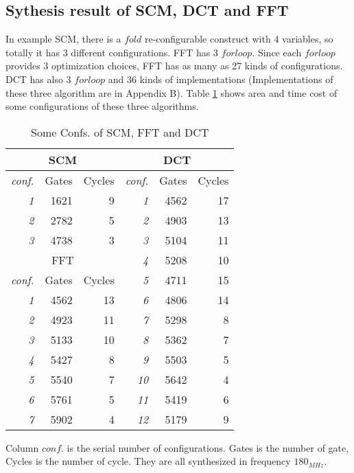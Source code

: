 \subsection{Sythesis result of SCM, DCT and FFT}
In example SCM, there is a $fold$ re-configurable construct with 4 variables, so totally it has 3 different configurations. FFT has 3 $forloop$. Since each $forloop$ provides 3 optimization choices, FFT has as many as 27 kinds of configurations. DCT has also 3 $forloop$ and 36 kinds of implementations (Implementations of these three algorithm are in Appendix B).
Table \ref{table:confs} shows area and time cost of some configurations of these three algorithms.
\begin{table}[hb]
\centering
\caption{Some Confs. of SCM, FFT and DCT}
\begin{tabular}{|r|rr|r|rr|} \hline
\multicolumn{3}{|c|}{SCM} & \multicolumn{3}{c|}{DCT} \\ \hline
\textit{conf.} & Gates & Cycles & \textit{conf.} & Gates & Cycles \\ \hline
\textit{1} & 1621 & 9 & \textit{1} & 4562 & 17 \\ 
\textit{2} & 2782 & 5 & \textit{2} & 4903 & 13 \\ 
\textit{3} & 4738 & 3 & \textit{3} & 5104 & 11 \\ \cline{1-3}
\multicolumn{3}{|c|}{FFT} & \textit{4} & 5208 & 10 \\ \cline{1-3}
\textit{conf.} & Gates & Cycles & \textit{5} & 4711 & 15 \\ \cline{1-3}
\textit{1} & 4562 & 13 & \textit{6} & 4806 & 14 \\
\textit{2} & 4923 & 11 & \textit{7} & 5298 & 8 \\
\textit{3} & 5133 & 10 & \textit{8} & 5362 & 7 \\
\textit{4} & 5427 & 8 & \textit{9} & 5503 & 5 \\
\textit{5} & 5540 & 7 & \textit{10} & 5642 & 4 \\
\textit{6} & 5761 & 5 & \textit{11} & 5419 & 6 \\
\textit{7} & 5902 & 4 & \textit{12} & 5179 & 9 \\ \hline
\end{tabular}
\label{table:confs}
\end{table}
Column $conf.$ is the serial number of configurations. Gates is the number of gate, Cycles is the number of cycle. They are all synthesized in frequency $180_{MHz}$.   
